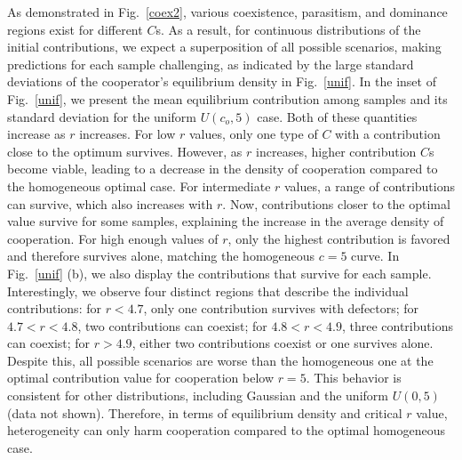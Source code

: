 \documentclass[twocolumn,aps,amsmath,pre,floatfix,superscriptaddress]{revtex4-2}
\begin{document}
As demonstrated in Fig.~\ref{coex2}, various coexistence, parasitism, and dominance regions exist for different $C$s. As a result, for continuous distributions of the initial contributions, we expect a superposition of all possible scenarios, making predictions for each sample challenging, as indicated by the large standard deviations of the cooperator's equilibrium density in Fig.~\ref{unif}. 
%
In the inset of Fig.~\ref{unif}, we present the mean equilibrium contribution among samples and its standard deviation for the uniform $U(c_{o},5)$ case. Both of these quantities increase as $r$ increases. For low $r$ values, only one type of $C$ with a contribution close to the optimum survives. However, as $r$ increases, higher contribution $C$s become viable, leading to a decrease in the density of cooperation compared to the homogeneous optimal case.
%
For intermediate $r$ values, a range of contributions can survive, which also increases with $r$. Now, contributions closer to the optimal value survive for some samples, explaining the increase in the average density of cooperation. For high enough values of $r$, only the highest contribution is favored and therefore survives alone, matching the homogeneous $c=5$ curve.
%
In Fig.~\ref{unif} (b), we also display the contributions that survive for each sample. Interestingly, we observe four distinct regions that describe the individual contributions: for $r<4.7$, only one contribution survives with defectors; for $4.7<r<4.8$, two contributions can coexist; for $4.8<r<4.9$, three contributions can coexist; for $r>4.9$, either two contributions coexist or one survives alone.
%
Despite this, all possible scenarios are worse than the homogeneous one at the optimal contribution value for cooperation below $r=5$. This behavior is consistent for other distributions, including Gaussian and the uniform $U(0,5)$ (data not shown). 
%
Therefore, in terms of equilibrium density and critical $r$ value, heterogeneity can only harm cooperation compared to the optimal homogeneous case. 
%
\end{document}
